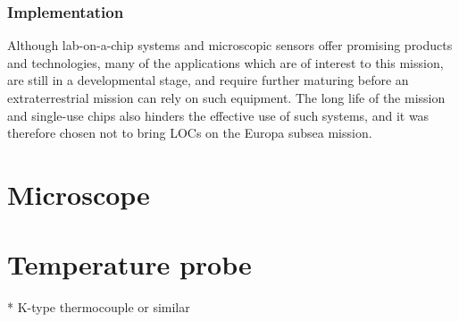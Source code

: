 \subsubsection{Implementation}
Although lab-on-a-chip systems and microscopic sensors offer promising products and technologies, many of the applications which are of interest to this mission, are still in a developmental stage, and require further maturing before an extraterrestrial mission can rely on such equipment. The long life of the mission and single-use chips also hinders the effective use of such systems, and it was therefore chosen not to bring LOCs on the Europa subsea mission.





\section{Microscope}

\section{Temperature probe}

* K-type thermocouple or similar
